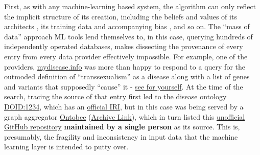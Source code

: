 First, as with any machine-learning based system, the algorithm can only
reflect the implicit structure of its creation, including the beliefs
and values of its architects \cite{birhaneValuesEncodedMachine2022, birhaneAlgorithmicInjusticeRelational2021} , its training data and
accompanying bias \cite{birhaneMultimodalDatasetsMisogyny2021} ,
and so on. The ``mass of data'' approach ML tools lend themselves to, in
this case, querying hundreds of independently operated databases, makes
dissecting the provenance of every entry from every data provider
effectively impossible. For example, one of the providers,
\href{https://mydisease.info}{mydisease.info} was more than happy to
respond to a query for the outmoded definition of ``transsexualism'' as
a disease \cite{ramTransphobiaEncodedExamination2021}  along with
a list of genes and variants that supposedly ``cause'' it -
\href{https://web.archive.org/web/20230315040436/mydisease.info/v1/query?q=\%22DOID\%3A10919\%22}{see
for yourself}. At the time of the search, tracing the source of that
entry first led to the disease ontology
\href{https://web.archive.org/web/20211007053446/https://www.ebi.ac.uk/ols/ontologies/doid/terms?iri=http\%3A\%2F\%2Fpurl.obolibrary.org\%2Fobo\%2FDOID_1234}{DOID:1234},
which has an \href{http://purl.obolibrary.org/obo/doid.owl}{official
IRI}, but in this case was being served by a graph aggregator
\href{http://www.ontobee.org/ontology/DOID?iri=http://purl.obolibrary.org/obo/DOID_1234}{Ontobee}
(\href{https://web.archive.org/web/20210923110103/http://www.ontobee.org/ontology/DOID?iri=http://purl.obolibrary.org/obo/DOID_1234}{Archive
Link}), which in turn listed this
\href{https://github.com/jannahastings/mental-functioning-ontology}{unofficial
GitHub repository} \textbf{maintained by a single person} as its
source. This is,
presumably, the fragility and inconsistency in input data that the
machine learning layer is intended to putty over.

